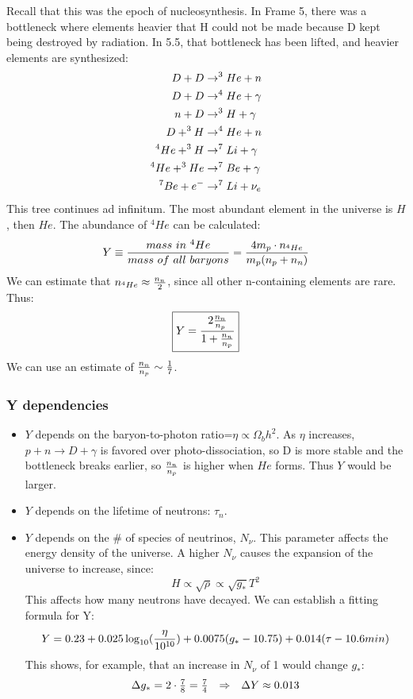 \documentclass{article}
\def\imply{\Rightarrow}
\def\imply{\Rightarrow}
\begin{document}
Recall that this was the epoch of nucleosynthesis.  In Frame 5, there was 
a bottleneck where elements heavier that H could not be made because D kept
being destroyed by radiation.  In 5.5, that bottleneck has been lifted, and
heavier elements are synthesized:
\begin{align}
D+D&\to^3He+n\\
D+D&\to^4He+\gamma\\
n+D&\to^3H+\gamma\\
D+^3H&\to^4He+n\\
^4He+^3H&\to^7Li+\gamma\\
^4He+^3He&\to^7Be+\gamma\\
^7Be+e^-&\to^7Li+\nu_e\\
\end{align}
This tree continues ad infinitum.  The most abundant element in the universe
is $H$, then $He$.  The abundance of $^4He$ can be calculated:
$$Y\equiv{mass\ in\ ^4He\over mass\ of\ all\ baryons}
={4m_p\cdot n_{^4He}\over m_p(n_p+n_n)}$$
We can estimate that $n_{^4He}\approx{n_n\over2}$, since all other n-containing
elements are rare.  Thus:
$$\boxed{Y={2{n_n\over n_p}\over1+{n_n\over n_p}}}$$
We can use an estimate of ${n_n\over n_p}\sim{1\over7}$.

\subsubsection*{ Y dependencies}
\begin{itemize}
\item $Y$ depends on the baryon-to-photon ratio=$\eta\propto\Omega_bh^2$.  
As $\eta$ increases, $p+n\to D+\gamma$ is favored over photo-dissociation, so
D is more stable and the bottleneck breaks earlier, so $n_n\over n_p$ is
higher when $He$ forms.  Thus $Y$ would be larger.

\item $Y$ depends on the lifetime of neutrons: $\tau_n$.  
\item $Y$ depends on the \# of species of neutrinos, $N_\nu$.  This parameter 
affects the energy density of the universe.  A higher $N_\nu$ causes the 
expansion of the universe to increase, since:
$$H\propto\sqrt{\rho}\propto\sqrt{g_*}T^2$$
This affects how many neutrons have decayed.  We can establish a fitting
formula for Y:
$$Y=0.23+0.025\log_{10}({\eta\over10^{10}})+
0.0075(g_*-10.75)+0.014(\tau-10.6min)$$
This shows, for example, that an increase in $N_\nu$ of 1 would change
$g_*$:
$$\begin{matrix}\Delta g_*=2\cdot{7\over8}={7\over4}&\imply&
\Delta Y\approx0.013\end{matrix}$$
\end{itemize}
\end{document}

